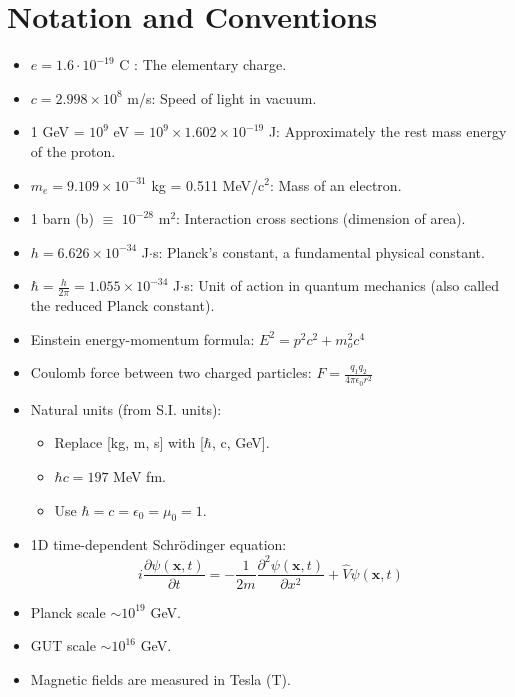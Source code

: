 \documentclass[a4paper, american, 12pt]{report}
\begin{document}
	
	\newpage
	\chapter*{Notation and Conventions}
	\label{chap:Notations}
	\begin{itemize}
		\item $e=1.6\cdot10^{-19}$ C : The elementary charge.
		\item $c=2.998\times 10^{8}$ m/s: Speed of light in vacuum.
		\item 1 GeV = $10^9$ eV = $10^9\times 1.602\times 10^{-19}$ J: Approximately the rest mass energy of the proton.
		\item $m_e=9.109\times 10^{-31}$ kg = 0.511 MeV/c$^2$: Mass of an electron.
		\item  1 barn (b) $\equiv$ $10^{-28}$ m$^2$: Interaction cross sections (dimension of area).
		\item $h=6.626\times 10^{-34}$ J$\cdot$s: Planck's constant, a fundamental physical constant.
		\item $\hbar=\frac{h}{2\pi}=1.055\times 10^{-34}$ J$\cdot$s: Unit of action in quantum mechanics (also called the reduced Planck constant).
		\item Einstein energy-momentum formula: $E^2=p^2c^2+m_o^2c^4$
		\item Coulomb force between two charged particles: $F=\frac{q_1q_2}{4\pi \epsilon_0 r^2}$
		\item Natural units (from S.I. units):
		\begin{itemize}
			\item Replace [kg, m, s] with [$\hbar$, c, GeV].
			\item $\hbar c=197$ MeV fm.
			\item Use $\hbar=c=\epsilon_0=\mu_0=1$.
		\end{itemize}
		\item 1D time-dependent Schrödinger equation: \[i\frac{\partial \psi(\textbf{x},t)}{\partial t}=-\frac{1}{2m}\frac{\partial ^2\psi(\textbf{x},t)}{\partial x^2}+\hat{V}\psi(\textbf{x},t)\]
		\item Planck scale $\sim 10^{19}$ GeV.
		\item GUT scale $\sim 10^{16}$ GeV.
		\item Magnetic fields are measured in Tesla (T).
	\end{itemize}
		
\end{document}
